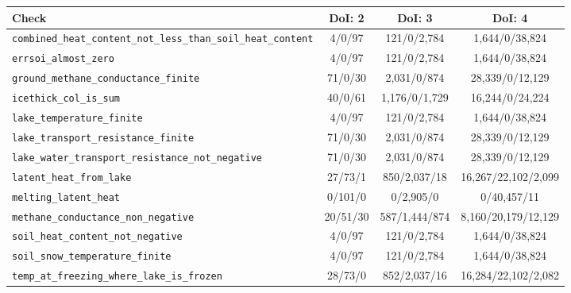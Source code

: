 \begin{tabular}{l c c c}
    \toprule
    Check & DoI: 2 & DoI: 3 & DoI: 4 \\
    \midrule
    \verb|combined_heat_content_not_less_than_soil_heat_content|
    & 4/0/97 & 121/0/2,784 & 1,644/0/38,824 \\
    \verb|errsoi_almost_zero|
    & 4/0/97 & 121/0/2,784 & 1,644/0/38,824 \\
    \verb|ground_methane_conductance_finite|
    & 71/0/30 & 2,031/0/874 & 28,339/0/12,129 \\
    \verb|icethick_col_is_sum|
    & 40/0/61 & 1,176/0/1,729 & 16,244/0/24,224 \\
    \verb|lake_temperature_finite|
    & 4/0/97 & 121/0/2,784 & 1,644/0/38,824 \\
    \verb|lake_transport_resistance_finite|
    & 71/0/30 & 2,031/0/874 & 28,339/0/12,129 \\
    \verb|lake_water_transport_resistance_not_negative|
    & 71/0/30 & 2,031/0/874 & 28,339/0/12,129 \\
    \verb|latent_heat_from_lake|
    & 27/73/1 & 850/2,037/18 & 16,267/22,102/2,099 \\
    \verb|melting_latent_heat|
    & 0/101/0 & 0/2,905/0 & 0/40,457/11 \\
    \verb|methane_conductance_non_negative|
    & 20/51/30 & 587/1,444/874 & 8,160/20,179/12,129 \\
    \verb|soil_heat_content_not_negative|
    & 4/0/97 & 121/0/2,784 & 1,644/0/38,824 \\
    \verb|soil_snow_temperature_finite|
    & 4/0/97 & 121/0/2,784 & 1,644/0/38,824 \\
    \verb|temp_at_freezing_where_lake_is_frozen|
    & 28/73/0 & 852/2,037/16 & 16,284/22,102/2,082 \\
    \bottomrule
\end{tabular} \\